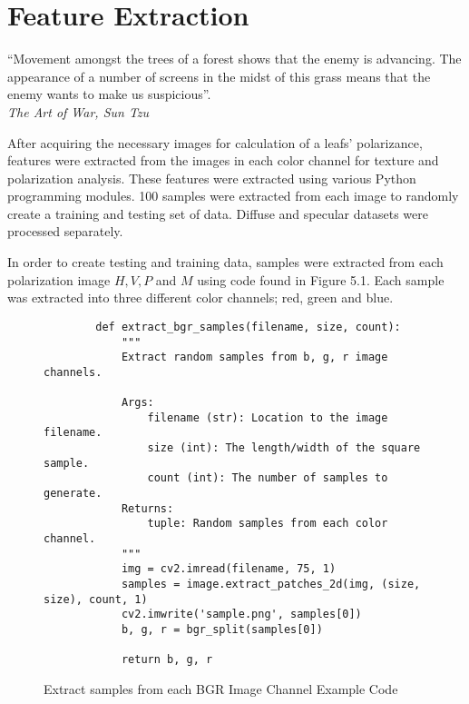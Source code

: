 \chapter{Feature Extraction}
\begin{center}
  \begin{minipage}{0.75\textwidth}
    \begin{small}
      “Movement amongst the trees of a forest shows that the enemy is advancing.  The appearance of a number of screens in the midst of this grass means that the enemy wants to make us suspicious”.\\
      \null\hfill\emph{The Art of War, Sun Tzu}
    \end{small}
  \end{minipage}
  \vspace{0.5cm}
\end{center}

After acquiring the necessary images for calculation of a leafs' polarizance, features were extracted from the images in each color channel for texture and polarization analysis.  These features were extracted using various Python programming modules. 100 samples were extracted from each image to randomly create a training and testing set of data.  Diffuse and specular datasets were processed separately.

In order to create testing and training data, samples were extracted from each polarization image $H, V, P$ and $M$ using code found in Figure 5.1.  Each sample was extracted into three different color channels; red, green and blue.

\begin{figure}
    \begin{lstlisting}
        def extract_bgr_samples(filename, size, count):
            """
            Extract random samples from b, g, r image channels.

            Args:
                filename (str): Location to the image filename.
                size (int): The length/width of the square sample.
                count (int): The number of samples to generate.
            Returns:
                tuple: Random samples from each color channel.
            """
            img = cv2.imread(filename, 75, 1)
            samples = image.extract_patches_2d(img, (size, size), count, 1)
            cv2.imwrite('sample.png', samples[0])
            b, g, r = bgr_split(samples[0])

            return b, g, r
    \end{lstlisting}
    \caption{Extract samples from each BGR Image Channel Example Code}
    \label{fig:scattering}
\end{figure}

